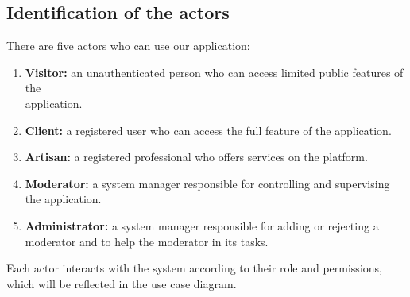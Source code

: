 \documentclass[12pt,a4paper]{report}
\begin{document}
\subsection{Identification of the actors}

There are five actors who can use our application:

\begin{enumerate}
    \item \textbf{Visitor:} an unauthenticated person who can access limited public features of the \\ application.
    \item \textbf{Client:} a registered user who can access the full feature of the application.
    \item \textbf{Artisan:} a registered professional who offers services on the platform.
    \item \textbf{Moderator:} a system manager responsible for controlling and supervising the application.
    \item \textbf{Administrator:} a system manager responsible for adding or rejecting a moderator and to help the moderator in its tasks.
\end{enumerate}

Each actor interacts with the system according to their role and permissions, which will be 
reflected in the use case diagram.
\end{document}
